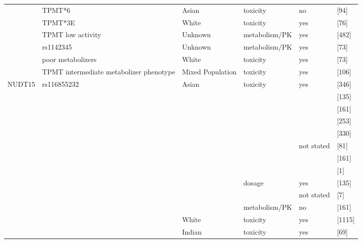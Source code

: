 \begin{center}
\begin{longtable}[H]{|l|l|l|l||l||l|}
\cline{2-6}
& TPMT*6 & Asian & toxicity & no & \citeauthor{pmid16396707} \citeyear{pmid16396707} [94] \\
\cline{2-6}
& TPMT*3E & White & toxicity & yes & \citeauthor{Colleoni_2013} \citeyear{Colleoni_2013} [76] \\
\cline{2-6}
& TPMT low activity & Unknown & metabolism/PK & yes & \citeauthor{pmid15570193} \citeyear{pmid15570193} [482] \\
\cline{2-6}
& rs1142345 & Unknown & metabolism/PK & yes & \citeauthor{Stocco_2014} \citeyear{Stocco_2014} [73] \\
\cline{2-6}
& poor metabolizers & White & toxicity & yes & \citeauthor{Steponaitiene_2016} \citeyear{Steponaitiene_2016} [73] \\
\cline{2-6}
& TPMT intermediate metabolizer phenotype & Mixed Population & toxicity & yes & \citeauthor{pmid12269967} \citeyear{pmid12269967} [106] \\
\hline\hline
\cline{2-6}
NUDT15 & rs116855232 & Asian & toxicity & yes & \citeauthor{Yang_2014} \citeyear{Yang_2014} [346] \\
\cline{6-6}
& & & & & \citeauthor{Kakuta_2015} \citeyear{Kakuta_2015} [135] \\
\cline{6-6}
& & & & & \citeauthor{Asada_2015} \citeyear{Asada_2015} [161] \\
\cline{6-6}
& & & & & \citeauthor{Zhu_2016} \citeyear{Zhu_2016} [253] \\
\cline{6-6}
& & & & & \citeauthor{Kim_2016} \citeyear{Kim_2016} [330] \\
\cline{5-6}
& & & & not stated & \citeauthor{Lee_2016} \citeyear{Lee_2016} [81] \\
\cline{6-6}
& & & & & \citeauthor{Asada_2015} \citeyear{Asada_2015} [161] \\
\cline{6-6}
& & & & & \citeauthor{Ailing_2016} \citeyear{Ailing_2016} [1] \\
\cline{4-6}
& & & dosage & yes & \citeauthor{Kakuta_2015} \citeyear{Kakuta_2015} [135] \\
\cline{5-6}
& & & & not stated & \citeauthor{pmid27095468} \citeyear{pmid27095468} [7] \\
\cline{4-6}
& & & metabolism/PK & no & \citeauthor{Asada_2015} \citeyear{Asada_2015} [161] \\
\cline{3-6}
& & White & toxicity & yes & \citeauthor{Yang_2014} \citeyear{Yang_2014} [1115] \\
\cline{3-6}
& & Indian & toxicity & yes & \citeauthor{Shah_2017} \citeyear{Shah_2017} [69] \\

\end{longtable}
\end{center}
